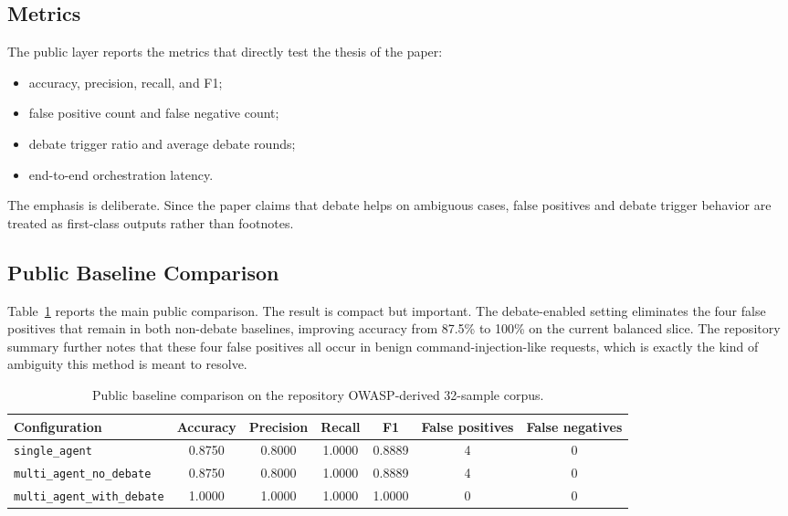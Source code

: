\documentclass[pdflatex,sn-mathphys-num]{sn-jnl}
\begin{document}
\subsection{Metrics}

The public layer reports the metrics that directly test the thesis of the paper:
\begin{itemize}
  \item accuracy, precision, recall, and F1;
  \item false positive count and false negative count;
  \item debate trigger ratio and average debate rounds;
  \item end-to-end orchestration latency.
\end{itemize}
The emphasis is deliberate. Since the paper claims that debate helps on ambiguous cases, false positives and debate trigger behavior are treated as first-class outputs rather than footnotes.

\subsection{Public Baseline Comparison}

Table~\ref{tab:public-baselines} reports the main public comparison. The result is compact but important. The debate-enabled setting eliminates the four false positives that remain in both non-debate baselines, improving accuracy from 87.5\% to 100\% on the current balanced slice. The repository summary further notes that these four false positives all occur in benign command-injection-like requests, which is exactly the kind of ambiguity this method is meant to resolve.

\begin{table}[t]
  \centering
  \footnotesize
  \caption{Public baseline comparison on the repository OWASP-derived 32-sample corpus.}
  \label{tab:public-baselines}
  \setlength{\tabcolsep}{5pt}
  \begin{tabularx}{\textwidth}{@{}lcccccc@{}}
    \toprule
    Configuration & Accuracy & Precision & Recall & F1 & False positives & False negatives \\
    \midrule
    \texttt{single\_agent} & 0.8750 & 0.8000 & 1.0000 & 0.8889 & 4 & 0 \\
    \texttt{multi\_agent\_no\_debate} & 0.8750 & 0.8000 & 1.0000 & 0.8889 & 4 & 0 \\
    \texttt{multi\_agent\_with\_debate} & 1.0000 & 1.0000 & 1.0000 & 1.0000 & 0 & 0 \\
    \bottomrule
  \end{tabularx}
\end{table}
\end{document}
